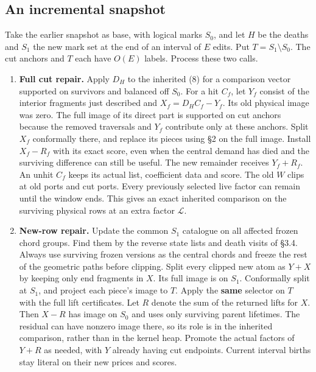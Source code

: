 \documentclass[11pt]{article}
\providecommand{\tightlist}{\setlength{\itemsep}{0pt}\setlength{\parskip}{0pt}}
\begin{document}
\hypertarget{an-incremental-snapshot}{%
\subsection{An incremental snapshot}\label{an-incremental-snapshot}}

Take the earlier snapshot as base, with logical marks \(S_0\), and let \(H\) be the deaths and \(S_1\) the new mark set at the end of an interval of \(E\) edits. Put \(T=S_1\setminus S_0\). The cut anchors and \(T\) each have \(O(E)\) labels. Process these two calls.

\begin{enumerate}
\def\labelenumi{\arabic{enumi}.}
\tightlist
\item
  \textbf{Full cut repair.} Apply \(D_H\) to the inherited (8) for a comparison vector supported on survivors and balanced off \(S_0\). For a hit \(C_f\), let \(Y_f\) consist of the interior fragments just described and \(X_f=D_H C_f-Y_f\). Its old physical image was zero. The full image of its direct part is supported on cut anchors because the removed traversals and \(Y_f\) contribute only at these anchors. Split \(X_f\) conformally there, and replace its pieces using §2 on the full image. Install \(X_f-R_f\) with its exact score, even when the central demand has died and the surviving difference can still be useful. The new remainder receives \(Y_f+R_f\). An unhit \(C_f\) keeps its actual list, coefficient data and score. The old \(W\) clips at old ports and cut ports. Every previously selected live factor can remain until the window ends. This gives an exact inherited comparison on the surviving physical rows at an extra factor \(\mathcal L\).
\item
  \textbf{New-row repair.} Update the common \(S_1\) catalogue on all affected frozen chord groups. Find them by the reverse state lists and death visits of §3.4. Always use surviving frozen versions as the central chords and freeze the rest of the geometric paths before clipping. Split every clipped new atom as \(Y+X\) by keeping only end fragments in \(X\). Its full image is on \(S_1\). Conformally split at \(S_1\), and project each piece's image to \(T\). Apply the \textbf{same} selector on \(T\) with the full lift certificates. Let \(R\) denote the sum of the returned lifts for \(X\). Then \(X-R\) has image on \(S_0\) and uses only surviving parent lifetimes. The residual can have nonzero image there, so its role is in the inherited comparison, rather than in the kernel heap. Promote the actual factors of \(Y+R\) as needed, with \(Y\) already having cut endpoints. Current interval births stay literal on their new prices and scores.
\end{enumerate}
\end{document}
